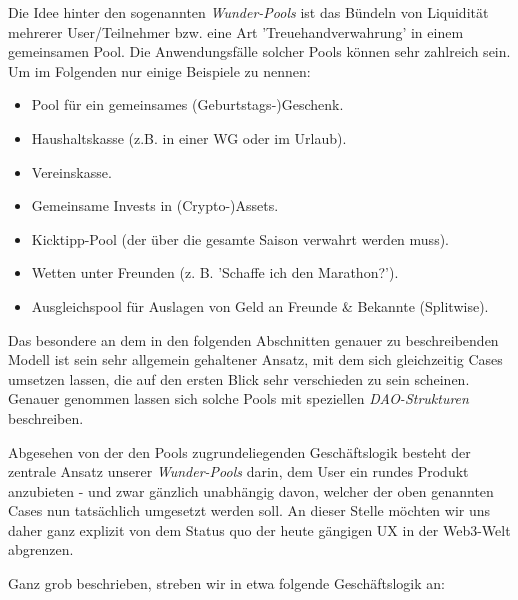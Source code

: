 
Die Idee hinter den sogenannten \textit{Wunder-Pools} ist das Bündeln von Liquidität mehrerer User/Teilnehmer bzw. eine Art 'Treuehandverwahrung' in einem gemeinsamen Pool. Die Anwendungsfälle solcher Pools können sehr zahlreich sein. Um im Folgenden nur einige Beispiele zu nennen:  

\begin{itemize}
  \item Pool für ein gemeinsames (Geburtstags-)Geschenk.
  \item Haushaltskasse (z.B. in einer WG oder im Urlaub).
  \item Vereinskasse.
  \item Gemeinsame Invests in (Crypto-)Assets.
  \item Kicktipp-Pool (der über die gesamte Saison verwahrt werden muss).
  \item Wetten unter Freunden (z. B. 'Schaffe ich den Marathon?').
  \item Ausgleichspool für Auslagen von Geld an Freunde \& Bekannte (Splitwise).
\end{itemize}

\vspace{0.2cm}

Das besondere an dem in den folgenden Abschnitten genauer zu beschreibenden Mo\-dell ist sein sehr allgemein gehaltener Ansatz, mit dem sich gleichzeitig Cases umsetzen lassen, die auf den ersten Blick sehr verschieden zu sein scheinen. Genauer genommen lassen sich solche Pools mit speziellen \textit{DAO-Strukturen} beschreiben.

Abgesehen von der den Pools zugrundeliegenden Geschäftslogik besteht der zentrale Ansatz unserer \textit{Wunder-Pools} darin, dem User ein rundes Produkt anzubieten - und zwar gänzlich unabhängig davon, welcher der oben genannten Cases nun tatsächlich umgesetzt werden soll. An dieser Stelle möchten wir uns daher ganz explizit von dem Status quo der heute gängigen UX in der Web3-Welt abgrenzen.

\vspace{0.4cm}

Ganz grob beschrieben, streben wir in etwa folgende Geschäftslogik an:

